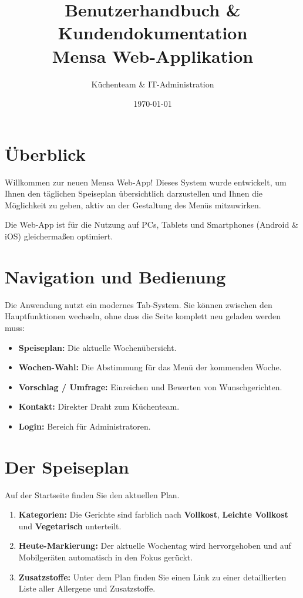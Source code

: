 \documentclass[12pt,a4paper]{article}
\title{\textbf{Benutzerhandbuch \& Kundendokumentation} \\ \Large Mensa Web-Applikation}
\author{Küchenteam \& IT-Administration}
\date{\today}
\begin{document}
\maketitle

\section{Überblick}
Willkommen zur neuen Mensa Web-App! Dieses System wurde entwickelt, um Ihnen den täglichen Speiseplan übersichtlich darzustellen und Ihnen die Möglichkeit zu geben, aktiv an der Gestaltung des Menüs mitzuwirken.

Die Web-App ist für die Nutzung auf PCs, Tablets und Smartphones (Android \& iOS) gleichermaßen optimiert.

\section{Navigation und Bedienung}
Die Anwendung nutzt ein modernes Tab-System. Sie können zwischen den Hauptfunktionen wechseln, ohne dass die Seite komplett neu geladen werden muss:
\begin{itemize}
    \item \textbf{Speiseplan:} Die aktuelle Wochenübersicht.
    \item \textbf{Wochen-Wahl:} Die Abstimmung für das Menü der kommenden Woche.
    \item \textbf{Vorschlag / Umfrage:} Einreichen und Bewerten von Wunschgerichten.
    \item \textbf{Kontakt:} Direkter Draht zum Küchenteam.
    \item \textbf{Login:} Bereich für Administratoren.
\end{itemize}

\section{Der Speiseplan}
Auf der Startseite finden Sie den aktuellen Plan.
\begin{enumerate}
    \item \textbf{Kategorien:} Die Gerichte sind farblich nach \textbf{Vollkost}, \textbf{Leichte Vollkost} und \textbf{Vegetarisch} unterteilt.
    \item \textbf{Heute-Markierung:} Der aktuelle Wochentag wird hervorgehoben und auf Mobilgeräten automatisch in den Fokus gerückt.
    \item \textbf{Zusatzstoffe:} Unter dem Plan finden Sie einen Link zu einer detaillierten Liste aller Allergene und Zusatzstoffe.
\end{enumerate}
\end{document}
